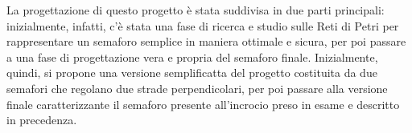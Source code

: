 La progettazione di questo progetto è stata suddivisa in due parti principali: inizialmente, infatti, c'è stata una fase di ricerca e studio sulle Reti di Petri per rappresentare un semaforo semplice in maniera ottimale e sicura, per poi passare a una fase di progettazione vera e propria del semaforo finale. Inizialmente, quindi, si propone una versione semplificatta del progetto costituita da due semafori che regolano due strade perpendicolari, per poi passare alla versione finale caratterizzante il semaforo presente all'incrocio preso in esame e descritto in precedenza.
